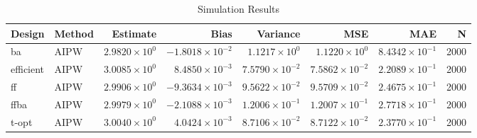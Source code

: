\begin{table}[ht]
\centering
\begin{tabular}{llrrrrrr}
  \toprule
Design & Method & Estimate & Bias & Variance & MSE & MAE & N \\ 
  \midrule
ba & AIPW & $2.9820 \times 10^{0}$ & $-1.8018 \times 10^{-2}$ & $1.1217 \times 10^{0}$ & $1.1220 \times 10^{0}$ & $8.4342 \times 10^{-1}$ & 2000 \\ 
   \midrule
efficient & AIPW & $3.0085 \times 10^{0}$ & $8.4850 \times 10^{-3}$ & $7.5790 \times 10^{-2}$ & $7.5862 \times 10^{-2}$ & $2.2089 \times 10^{-1}$ & 2000 \\ 
   \midrule
ff & AIPW & $2.9906 \times 10^{0}$ & $-9.3634 \times 10^{-3}$ & $9.5622 \times 10^{-2}$ & $9.5709 \times 10^{-2}$ & $2.4675 \times 10^{-1}$ & 2000 \\ 
   \midrule
ffba & AIPW & $2.9979 \times 10^{0}$ & $-2.1088 \times 10^{-3}$ & $1.2006 \times 10^{-1}$ & $1.2007 \times 10^{-1}$ & $2.7718 \times 10^{-1}$ & 2000 \\ 
   \midrule
t-opt & AIPW & $3.0040 \times 10^{0}$ & $4.0424 \times 10^{-3}$ & $8.7106 \times 10^{-2}$ & $8.7122 \times 10^{-2}$ & $2.3770 \times 10^{-1}$ & 2000 \\ 
   \bottomrule
\end{tabular}
\caption{Simulation Results} 
\label{tab:results}
\end{table}
